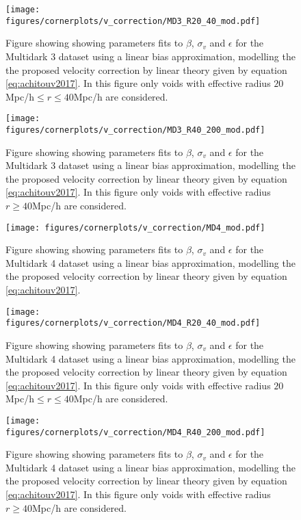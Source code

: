 \begin{figure}[htbp]\label{fig:linbiasMD3modR2040}
    \texttt{[image: figures/cornerplots/v\_correction/MD3\_R20\_40\_mod.pdf]}
    \caption{Figure showing showing parameters fits to $\beta$, $\sigma_v$ and $\epsilon$ for the Multidark 3 dataset using a linear bias approximation, modelling the the proposed velocity correction by \cite{Achitouv_streaming} linear theory given by equation \ref{eq:achitouv2017}. In this figure only voids with effective radius $20$Mpc/h$\leq r \leq 40$Mpc/h are considered.}
\end{figure}

\begin{figure}[htbp]\label{fig:linbiasMD3modR40}
    \texttt{[image: figures/cornerplots/v\_correction/MD3\_R40\_200\_mod.pdf]}
    \caption{Figure showing showing parameters fits to $\beta$, $\sigma_v$ and $\epsilon$ for the Multidark 3 dataset using a linear bias approximation, modelling the the proposed velocity correction by \cite{Achitouv_streaming} linear theory given by equation \ref{eq:achitouv2017}. In this figure only voids with effective radius $r \geq 40$Mpc/h are considered.}
\end{figure}


\begin{figure}[htbp]\label{fig:linbiasMD4mod}
    \texttt{[image: figures/cornerplots/v\_correction/MD4\_mod.pdf]}
    \caption{Figure showing showing parameters fits to $\beta$, $\sigma_v$ and $\epsilon$ for the Multidark 4 dataset using a linear bias approximation, modelling the the proposed velocity correction by \cite{Achitouv_streaming} linear theory given by equation \ref{eq:achitouv2017}.}
\end{figure}

\begin{figure}[htbp]\label{fig:linbiasMD4modR2040}
    \texttt{[image: figures/cornerplots/v\_correction/MD4\_R20\_40\_mod.pdf]}
    \caption{Figure showing showing parameters fits to $\beta$, $\sigma_v$ and $\epsilon$ for the Multidark 4 dataset using a linear bias approximation, modelling the the proposed velocity correction by \cite{Achitouv_streaming} linear theory given by equation \ref{eq:achitouv2017}. In this figure only voids with effective radius $20$Mpc/h$\leq r \leq 40$Mpc/h are considered.}
\end{figure}

\begin{figure}[htbp]\label{fig:linbiasMD4modR40}
    \texttt{[image: figures/cornerplots/v\_correction/MD4\_R40\_200\_mod.pdf]}
    \caption{Figure showing showing parameters fits to $\beta$, $\sigma_v$ and $\epsilon$ for the Multidark 4 dataset using a linear bias approximation, modelling the the proposed velocity correction by \cite{Achitouv_streaming} linear theory given by equation \ref{eq:achitouv2017}. In this figure only voids with effective radius $r \geq 40$Mpc/h are considered.}
\end{figure}

